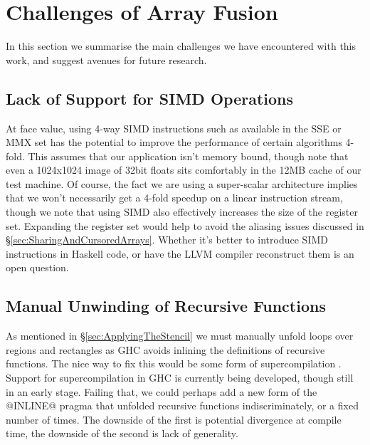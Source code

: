 
\section{Challenges of Array Fusion}
In this section we summarise the main challenges we have encountered with this work, and suggest avenues for future research.


\subsection{Lack of Support for SIMD Operations}
At face value, using 4-way SIMD instructions such as available in the SSE or MMX set has the potential to improve the performance of certain algorithms 4-fold. This assumes that our application isn't memory bound, though note that even a 1024x1024 image of 32bit floats sits comfortably in the 12MB cache of our test machine. Of course, the fact we are using a super-scalar architecture implies that we won't necessarily get a 4-fold speedup on a linear instruction stream, though we note that using SIMD also effectively increases the size of the register set. Expanding the register set would help to avoid the aliasing issues discussed in \S\ref{sec:SharingAndCursoredArrays}. Whether it's better to introduce SIMD instructions in Haskell code, or have the LLVM compiler reconstruct them is an open question. 


\subsection{Manual Unwinding of Recursive Functions}
\label{sec:ManualUnwinding}
As mentioned in \S\ref{sec:ApplyingTheStencil} we must manually unfold loops over regions and rectangles as GHC avoids inlining the definitions of recursive functions. The nice way to fix this would be some form of supercompilation \cite{Bolingbroke:supercompilation, Mitchell:supercompilation}. Support for supercompilation in GHC is currently being developed, though still in an early stage. Failing that, we could perhaps add a new form of the @INLINE@ pragma that unfolded recursive functions indiscriminately, or a fixed number of times. The downside of the first is potential divergence at compile time, the downside of the second is lack of generality.



